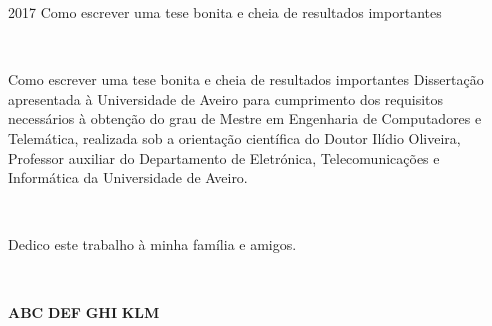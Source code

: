 \documentclass[11pt,twoside,a4paper]{report}
\def\ThesisYear{2017}
\begin{document}
%
%

\TitlePage
  \HEADER{\BAR\FIG{}}
         {\ThesisYear}
        {Como escrever uma tese bonita e cheia de resultados importantes}
        
\EndTitlePage
\titlepage\ \endtitlepage %


%
%

\TitlePage
  \HEADER{}{\ThesisYear}
        {Como escrever uma tese bonita e cheia de resultados importantes}
  \vspace*{15mm}
  \TEXT{}
       {Disserta\c c\~ao apresentada \`a Universidade de Aveiro para cumprimento dos requisitos necess\'arios \`a obten\c c\~ao do
        grau de Mestre em Engenharia de Computadores e Telem\'atica, realizada sob a orienta\c c\~ao cient\'ifica do Doutor Il\'idio Oliveira, Professor auxiliar do Departamento de Eletr\'onica, Telecomunica\c c\~oes e Inform\'atica da Universidade de Aveiro.}
\EndTitlePage
\titlepage\ \endtitlepage %


\titlepage\ 

\vspace*{30mm}\begin{flushright}
Dedico este trabalho à minha família e amigos.
\end{flushright}
\endtitlepage

\titlepage\ \endtitlepage %

\TitlePage
  \vspace*{55mm}
       {}
       {\textbf{ABC}}
  \vspace*{5mm}
       {\textbf{DEF}}
  \vspace*{5mm}
  \TEXT{}
       {\textbf{GHI}}
  \vspace*{5mm}
  \TEXT{}
       {\textbf{KLM}}
\EndTitlePage
\titlepage\ \endtitlepage %
\end{document}
